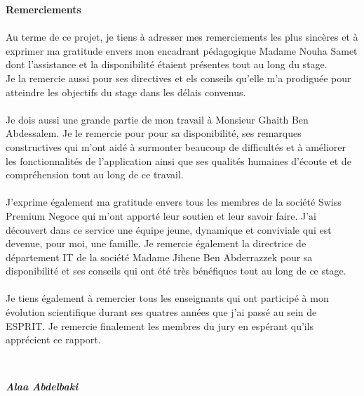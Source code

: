 \begin{center}
    \begin{huge}
        \textbf{Remerciements}
    \end{huge}
\end{center}
\vspace{2cm}
\begin{small}
    \justifying
    \paragraph{}
    \noindent Au terme de ce projet, je tiens à adresser mes remerciements les plus sincères et à exprimer ma gratitude envers mon encadrant pédagogique Madame Nouha Samet dont l'assistance et la disponibilité étaient présentes tout au long du stage.\\
    \noindent Je la remercie aussi pour ses directives et els conseils qu'elle m'a prodiguée pour atteindre les objectifs du stage dans les délais convenus.
    \paragraph{}
    \noindent Je dois aussi une grande partie de mon travail à Monsieur Ghaith Ben Abdessalem. Je le remercie pour pour sa disponibilité, ses remarques constructives qui m'ont aidé à surmonter beaucoup de difficultés et à améliorer les fonctionnalités de l'application ainsi que ses qualités humaines d'écoute et de compréhension tout au long de ce travail.
    \paragraph{}
    \noindent J'exprime également ma gratitude envers tous les membres de la société Swiss Premium Negoce qui m'ont apporté leur soutien et leur savoir faire. J'ai découvert dans ce service une équipe jeune, dynamique et conviviale qui est devenue, pour moi, une famille. Je remercie également la directrice de département IT de la société Madame Jihene Ben Abderrazzek pour sa disponibilité et ses conseils qui ont été très bénéfiques tout au long de ce stage.
    \paragraph{}
    Je tiens également à remercier tous les enseignants qui ont participé à mon évolution scientifique durant ses quatres années que j'ai passé au sein de ESPRIT. Je remercie finalement les membres du jury en espérant qu'ils apprécient ce rapport.
\end{small} \\
\bigbreak
\begin{flushright}
    \textbf{\textit{Alaa Abdelbaki}}
\end{flushright}